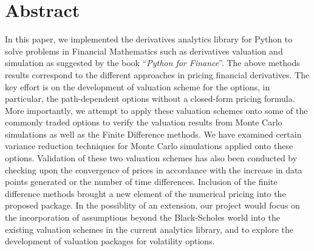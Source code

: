 \section*{Abstract}
In this paper, we implemented the derivatives analytics library for Python to solve problems in Financial Mathematics such as derivatives valuation and simulation as suggested by the book ``\emph{Python for Finance}''\cite{PythonForFinance}. The above methods results correspond to the different approaches in pricing financial derivatives. The key effort is on the development of valuation scheme for the options, in particular, the path-dependent options without a closed-form pricing formula. More importantly, we attempt to apply these valuation schemes onto some of the commonly traded options to verify the valuation results from Monte Carlo simulations as well as the Finite Difference methods. We have examined certain variance reduction techniques for Monte Carlo simulations applied onto these options. Validation of these two valuation schemes has also been conducted by checking upon the convergence of prices in accordance with the increase in data points generated or the number of time differences. Inclusion of the finite difference methods brought a new element of the numerical pricing into the proposed package. In the possiblity of an extension, our project would focus on the incorporation of assumptions beyond the Black-Scholes world into the existing valuation schemes in the current analytics library, and to explore the development of valuation packages for volatility options.

